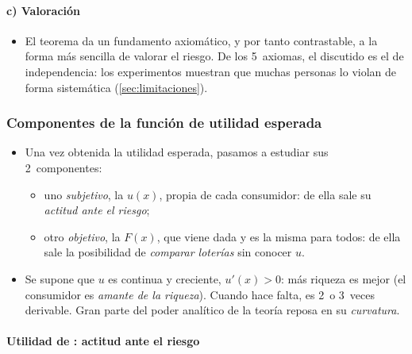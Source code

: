 \documentclass[11pt]{article}
\begin{document}
\paragraph{c) Valoración}

\begin{itemize}
\item El teorema da un fundamento axiomático, y por tanto contrastable, a la forma más sencilla de valorar el riesgo. De los 5~axiomas, el discutido es el de independencia: los experimentos muestran que muchas personas lo violan de forma sistemática (\ref{sec:limitaciones}).
\end{itemize}

\subsubsection{Componentes de la función de utilidad esperada}\label{sec:componentes}

\begin{itemize}
\item Una vez obtenida la utilidad esperada, pasamos a estudiar sus 2~componentes:
  \begin{itemize}
  \item uno \emph{subjetivo}, la  $u(x)$, propia de cada consumidor: de ella sale su \emph{actitud ante el riesgo};
  \item otro \emph{objetivo}, la  $F(x)$, que viene dada y es la misma para todos: de ella sale la posibilidad de \emph{comparar loterías} sin conocer $u$.
  \end{itemize}
\item Se supone que $u$ es continua y creciente, $u'(x)>0$: más riqueza es mejor (el consumidor es \emph{amante de la riqueza}). Cuando hace falta, es 2~o 3~veces derivable. Gran parte del poder analítico de la teoría reposa en su \emph{curvatura}.
\end{itemize}

\paragraph{Utilidad de : actitud ante el riesgo}
\end{document}
